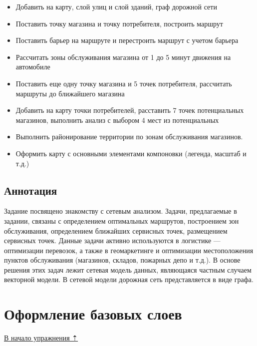 \documentclass[12pt,]{book}
\providecommand{\tightlist}{%
  \setlength{\itemsep}{0pt}\setlength{\parskip}{0pt}}
\begin{document}
\begin{itemize}
\tightlist
\item
  Добавить на карту, слой улиц и слой зданий, граф дорожной сети
\item
  Поставить точку магазина и точку потребителя, построить маршрут
\item
  Поставить барьер на маршруте и перестроить маршрут с учетом барьера
\item
  Рассчитать зоны обслуживания магазина от 1 до 5 минут движения на автомобиле
\item
  Поставить еще одну точку магазина и 5 точек потребителя, рассчитать маршруты до ближайшего магазина
\item
  Добавить на карту точки потребителей, расставить 7 точек потенциальных магазинов, выполнить анализ с выбором 4 мест из потенциальных
\item
  Выполнить районирование территории по зонам обслуживания магазинов.
\item
  Оформить карту с основными элементами компоновки (легенда, масштаб и т.д.)
\end{itemize}

\hypertarget{network-analysis-annotation}{%
\subsection{Аннотация}\label{network-analysis-annotation}}

Задание посвящено знакомству с сетевым анализом. Задачи, предлагаемые в задании, связаны с определением оптимальных маршрутов, построением зон обслуживания, определением ближайших сервисных точек, размещением сервисных точек. Данные задачи активно используются в логистике --- оптимизации перевозок, а также в геомаркетинге и оптимизации местоположения пунктов обслуживания (магазинов, складов, пожарных депо и т.д.). В основе решения этих задач лежит сетевая модель данных, являющаяся частным случаем векторной модели. В сетевой модели дорожная сеть представляется в виде графа.

\hypertarget{network-analysis-basemap}{%
\section{Оформление базовых слоев}\label{network-analysis-basemap}}

\protect\hyperlink{network-analysis}{В начало упражнения ⇡}
\end{document}
